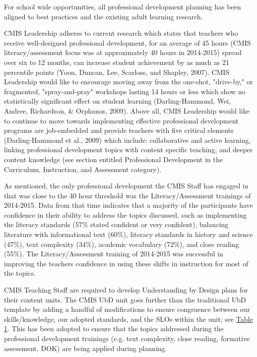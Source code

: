 \begin{findings}
For school wide opportunities, all professional development planning has been aligned to best practices and the existing adult learning research. 


CMIS Leadership adheres to current research which states that teachers who receive well-designed professional development, for an average of 45 hours (CMIS literacy/assessment focus was at approximately 40 hours in 2014-2015) spread over six to 12 months, can increase student achievement by as much as 21 percentile points (Yoon, Duncan, Lee, Scarloss, and Shapley, 2007). CMIS Leadership would like to encourage moving away from the one-shot, "drive-by," or fragmented, "spray-and-pray" workshops lasting 14 hours or less which show no statistically significant effect on student learning (Darling-Hammond, Wei, Andree, Richardson, \& Orphanos, 2009). Above all, CMIS Leadership would like to continue to move towards implementing effective professional development programs are job-embedded and provide teachers with five critical elements (Darling-Hammond et al., 2009)  which include: collaborative and active learning, linking professional development topics with content specific teaching, and deeper content knowledge (see section entitled Professional Development in the Curriculum, Instruction, and Assessment category).


As mentioned, the only professional development the CMIS Staff has engaged in that was close to the 40 hour threshold was the Literacy/Assessment trainings of 2014-2015. Data from that time indicates that a majority of the participants have confidence in their ability to address the topics discussed, such as implementing the literacy standards (57\% stated confident or very confident), balancing literature with informational text (60\%), literacy standards in history and science (47\%), text complexity (34\%), academic vocabulary (72\%), and close reading (55\%). The Literacy/Assessment training of 2014-2015 was successful in improving the teachers confidence in using these shifts in instruction for most of the topics. 


CMIS Teaching Staff are required to develop Understanding by Design plans for their content units. The CMIS UbD unit goes further than the traditional UbD template by adding a handful of modifications to ensure congruence between our skills/knowledge, our adopted standards, and the SLOs within the unit; see \href{https://docs.google.com/a/cmis.ac.th/document/d/1wwb5O3EmHNmzx7MOdHvi0TFjyYRWyELnyD1VRsmuj1Y/edit?usp=sharing}{Table 1}.  This has been adopted to ensure that the topics addressed during the professional development trainings (e.g. text complexity, close reading, formative assessment, DOK) are being applied during planning. 


\end{findings}
